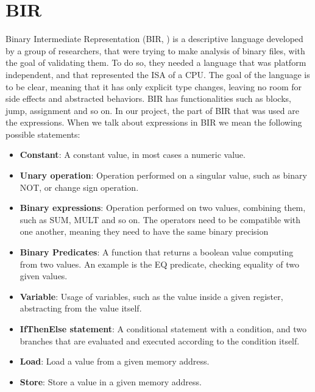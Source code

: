 \section{BIR}
\label{cha:BIR} Binary Intermediate Representation (BIR, \cite{bir_pub}) is a descriptive
language developed by a group of researchers, that were trying to make analysis
of binary files, with the goal of validating them. To do so, they needed a language
that was platform independent, and that represented the ISA of a CPU. The goal of
the language is to be clear, meaning that it has only explicit type changes, leaving
no room for side effects and abstracted behaviors. BIR has functionalities such
as blocks, jump, assignment and so on. In our project, the part of BIR that was
used are the expressions. When we talk about expressions in BIR we mean the following
possible statements:
\begin{itemize}
  \item \textbf{Constant}: A constant value, in most cases a numeric value.

  \item \textbf{Unary operation}: Operation performed on a singular value, such
    as binary NOT, or change sign operation.

  \item \textbf{Binary expressions}: Operation performed on two values,
    combining them, such as SUM, MULT and so on. The operators need to be compatible
    with one another, meaning they need to have the same binary precision

  \item \textbf{Binary Predicates}: A function that returns a boolean value computing
    from two values. An example is the EQ predicate, checking equality of two given
    values.

  \item \textbf{Variable}: Usage of variables, such as the value inside a given
    register, abstracting from the value itself.

  \item \textbf{IfThenElse statement}: A conditional statement with a condition,
    and two branches that are evaluated and executed according to the condition
    itself.

  \item \textbf{Load}: Load a value from a given memory address.

  \item \textbf{Store}: Store a value in a given memory address.


\end{itemize}
